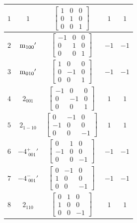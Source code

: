 \documentclass[fleqn,8pt]{jsarticle}
\begin{document}
\begin{longtable}{ccccc}
$ 1 $ & $ 1 $ & $ \begin{bmatrix} 1 & 0 & 0 \\ 0 & 1 & 0 \\ 0 & 0 & 1 \end{bmatrix} $ & $ 1 $ & $ 1 $ \\ \hline
$ 2 $ & $ {\rm m}_{100}{}' $ & $ \begin{bmatrix} -1 & 0 & 0 \\ 0 & 1 & 0 \\ 0 & 0 & 1 \end{bmatrix} $ & $ -1 $ & $ -1 $ \\ \hline
$ 3 $ & $ {\rm m}_{010}{}' $ & $ \begin{bmatrix} 1 & 0 & 0 \\ 0 & -1 & 0 \\ 0 & 0 & 1 \end{bmatrix} $ & $ -1 $ & $ -1 $ \\ \hline
$ 4 $ & $ 2{}_{001} $ & $ \begin{bmatrix} -1 & 0 & 0 \\ 0 & -1 & 0 \\ 0 & 0 & 1 \end{bmatrix} $ & $ 1 $ & $ 1 $ \\ \hline
$ 5 $ & $ 2{}_{1-10} $ & $ \begin{bmatrix} 0 & -1 & 0 \\ -1 & 0 & 0 \\ 0 & 0 & -1 \end{bmatrix} $ & $ 1 $ & $ 1 $ \\ \hline
$ 6 $ & $ -4^{+}_{\,\,001}{}' $ & $ \begin{bmatrix} 0 & 1 & 0 \\ -1 & 0 & 0 \\ 0 & 0 & -1 \end{bmatrix} $ & $ -1 $ & $ -1 $ \\ \hline
$ 7 $ & $ -4^{-}_{\,\,001}{}' $ & $ \begin{bmatrix} 0 & -1 & 0 \\ 1 & 0 & 0 \\ 0 & 0 & -1 \end{bmatrix} $ & $ -1 $ & $ -1 $ \\ \hline
$ 8 $ & $ 2{}_{110} $ & $ \begin{bmatrix} 0 & 1 & 0 \\ 1 & 0 & 0 \\ 0 & 0 & -1 \end{bmatrix} $ & $ 1 $ & $ 1 $ \\
\end{longtable}
\end{document}

